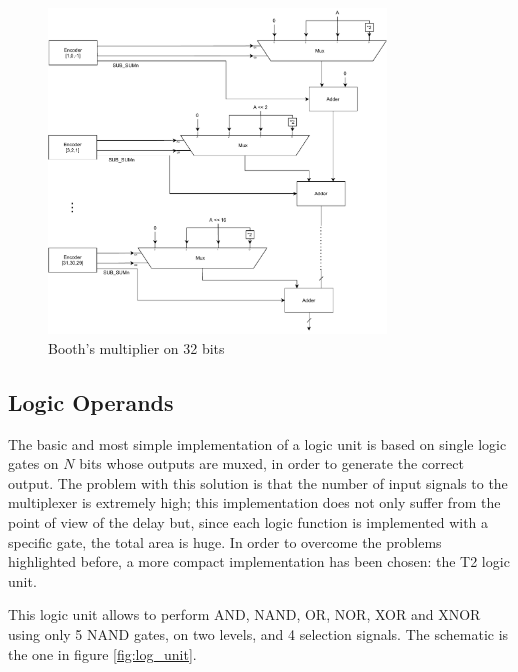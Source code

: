 \begin{figure}[ht]
	\centering
	\includegraphics[width=0.8\textwidth]{chapters/5_ExecuteStage/images/multiplier.pdf}
	\caption{Booth's multiplier on 32 bits}
	\label{fig:multiplier}
\end{figure}

	
\subsection{Logic Operands}
The basic and most simple implementation of a logic unit is based on single logic gates on $N$ bits whose outputs are muxed, in order to generate the correct output. The problem with this solution is that the number of input signals to the multiplexer is extremely high; this implementation does not only suffer from the point of view of the delay but, since each logic function is implemented with a specific gate, the total area is huge.\newline\newline
In order to overcome the problems highlighted before, a more compact implementation has been chosen: the T2 logic unit.

This logic unit allows to perform AND, NAND, OR, NOR, XOR and XNOR using only 5 NAND gates, on two levels, and 4 selection signals. The schematic is the one in figure \ref{fig:log_unit}.

